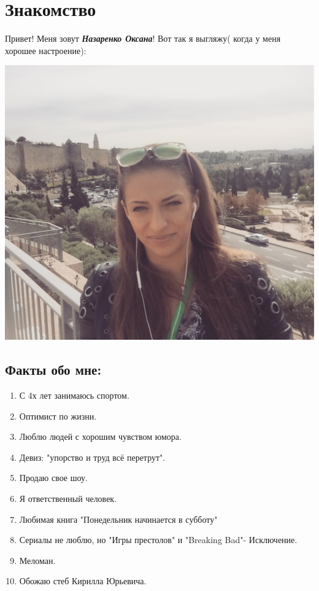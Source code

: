 \documentclass[12pt, a4paper]{article}
\begin{document}
\section{Знакомство}

Привет! Меня зовут  \textbf{\it Назаренко Оксана}!
Вот так я выгляжу( когда у меня хорошее настроение):

\includegraphics[scale=0.25]{Photo1}
\subsection{Факты обо мне:}
\begin{enumerate}
\item С 4х лет занимаюсь спортом.
\item Оптимист по жизни.
\item Люблю людей с хорошим чувством юмора.
\item Девиз: "упорство и труд всё перетрут".
\item Продаю свое шоу.
\item Я ответственный человек.
\item Любимая книга "Понедельник начинается в субботу"
\item Сериалы не люблю, но "Игры престолов" и "Breaking Bad"- Исключение.
\item Меломан.
\item Обожаю стеб Кирилла Юрьевича.
\end{enumerate}
\end{document}
